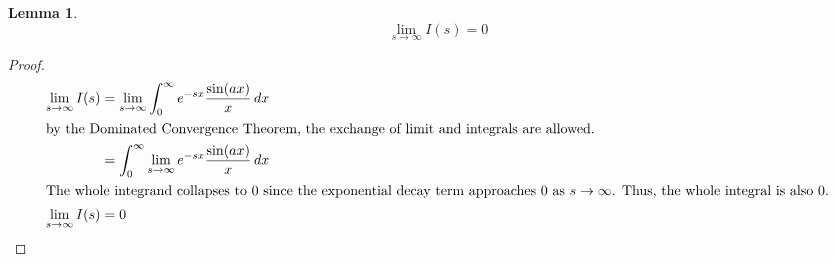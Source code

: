 \documentclass[12pt]{article}
\theoremstyle{definition}
\newtheorem{lemma}{Lemma}
\begin{document}
\begin{lemma}
    \begin{equation*}
        \lim_{s \to \infty} I(s) = 0
    \end{equation*}
\end{lemma}
\begin{proof}
    \begin{align*}
    \lim_{s \to \infty} I(s) &= \lim_{s \to \infty} \int_{0}^{\infty} e^{-sx} \frac{\sin(ax)}{x} \,dx \\ 
    \intertext{by the Dominated Convergence Theorem, the exchange of limit and integrals are allowed.}
    &=  \int_{0}^{\infty} \lim_{s \to \infty} e^{-sx} \frac{\sin(ax)}{x} \,dx \\
    \intertext{The whole integrand collapses to $0$ since the exponential decay term approaches 0 as $s \to \infty$. Thus, the whole integral is also $0$.}
    \lim_{s \to \infty} I(s) &= 0
    \end{align*}
\end{proof}
\end{document}
